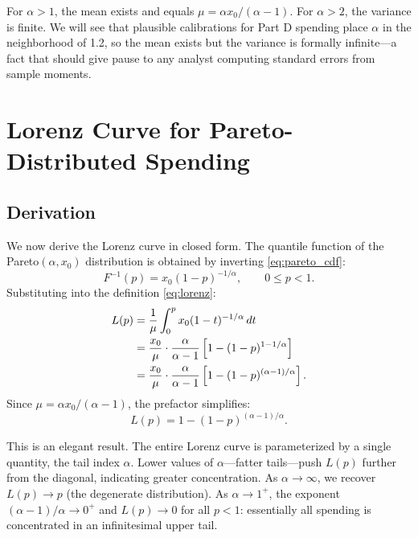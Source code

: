 \documentclass[12pt,letterpaper]{article}
\begin{document}
For $\alpha > 1$, the mean exists and equals $\mu = \alpha x_0 / (\alpha -
1)$. For $\alpha > 2$, the variance is finite. We will see that plausible
calibrations for Part D spending place $\alpha$ in the neighborhood of 1.2,
so the mean exists but the variance is formally infinite---a fact that should
give pause to any analyst computing standard errors from sample moments.

\section{Lorenz Curve for Pareto-Distributed Spending}\label{sec:lorenz}

\subsection{Derivation}

We now derive the Lorenz curve in closed form. The quantile function of the
Pareto$(\alpha, x_0)$ distribution is obtained by inverting
\eqref{eq:pareto_cdf}:
\begin{equation}\label{eq:quantile}
  F^{-1}(p) = x_0 (1 - p)^{-1/\alpha}, \qquad 0 \le p < 1.
\end{equation}
Substituting into the definition \eqref{eq:lorenz}:
\begin{align}
  L(p) &= \frac{1}{\mu} \int_0^p x_0 (1-t)^{-1/\alpha}\, dt \notag \\
       &= \frac{x_0}{\mu} \cdot \frac{\alpha}{\alpha - 1}
          \left[1 - (1-p)^{1 - 1/\alpha}\right] \notag \\
       &= \frac{x_0}{\mu} \cdot \frac{\alpha}{\alpha - 1}
          \left[1 - (1-p)^{(\alpha-1)/\alpha}\right]. \label{eq:lorenz_pareto}
\end{align}
Since $\mu = \alpha x_0 / (\alpha - 1)$, the prefactor simplifies:
\begin{equation}\label{eq:lorenz_final}
  \boxed{L(p) = 1 - (1-p)^{(\alpha - 1)/\alpha}.}
\end{equation}

This is an elegant result. The entire Lorenz curve is parameterized by a
single quantity, the tail index $\alpha$. Lower values of $\alpha$---fatter
tails---push $L(p)$ further from the diagonal, indicating greater
concentration. As $\alpha \to \infty$, we recover $L(p) \to p$ (the
degenerate distribution). As $\alpha \to 1^+$, the exponent $(\alpha -
1)/\alpha \to 0^+$ and $L(p) \to 0$ for all $p < 1$: essentially all
spending is concentrated in an infinitesimal upper tail.
\end{document}
